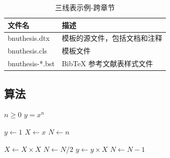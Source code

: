 \begin{table}
  \centering
  \caption{三线表示例-跨章节}
  \begin{tabular}{ll}
    \toprule
    文件名          & 描述                         \\
    \midrule
    bnuthesis.dtx   & 模板的源文件，包括文档和注释 \\
    bnuthesis.cls   & 模板文件                     \\
    bnuthesis-*.bst & BibTeX 参考文献表样式文件    \\
    \bottomrule
  \end{tabular}
  \label{tab:three-line2}
\end{table}

\subsection{算法}

\renewcommand{\algorithmicrequire}{\textbf{输入：}\unskip}
\renewcommand{\algorithmicensure}{\textbf{输出：}\unskip}

\begin{algorithm}
  \caption{Calculate $y = x^n$}
  \label{alg2}
  \small
  \begin{algorithmic}
    \REQUIRE $n \geq 0$
    \ENSURE $y = x^n$

    \STATE $y \leftarrow 1$
    \STATE $X \leftarrow x$
    \STATE $N \leftarrow n$

        \STATE $X \leftarrow X \times X$
        \STATE $N \leftarrow N / 2$
      \ELSE[$N$ is odd]
        \STATE $y \leftarrow y \times X$
        \STATE $N \leftarrow N - 1$
      \ENDIF
    \ENDWHILE
  \end{algorithmic}
\end{algorithm}


